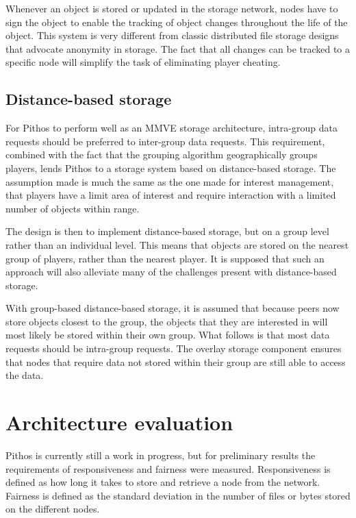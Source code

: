 \documentclass[10pt,a4paper,conference]{IEEEtran}
\begin{document}
Whenever an object is stored or updated in the storage network, nodes have to sign the object to enable the tracking of object changes throughout the
life of the object. This system is very different from classic distributed file storage designs that advocate anonymity in storage. The fact that all
changes can be tracked to a specific node will simplify the task of eliminating player cheating.

\subsection{Distance-based storage} \label{distance_based}

For Pithos to perform well as an MMVE storage architecture, intra-group data requests should be preferred to inter-group data requests. This
requirement, combined with the fact that the grouping algorithm geographically groups players, lends Pithos to a storage system based on
distance-based storage. The assumption made is much the same as the one made for interest management, that players have a limit area of interest and
require interaction with a limited number of objects within range.

The design is then to implement distance-based storage, but on a group level rather than an individual level. This means that objects are stored on
the nearest group of players, rather than the nearest player. It is supposed that such an approach will also alleviate many of the challenges present
with distance-based storage.

With group-based distance-based storage, it is assumed that because peers now store objects closest to the group, the objects that they are
interested in will most likely be stored within their own group. What follows is that most data requests should be intra-group requests. The overlay
storage component ensures that nodes that require data not stored within their group are still able to access the data.

\section{Architecture evaluation}

Pithos is currently still a work in progress, but for preliminary results the requirements of responsiveness and fairness were measured.
Responsiveness is defined as how long it takes to store and retrieve a node from the network. Fairness is defined as the standard deviation in the
number of files or bytes stored on the different nodes.
\end{document}
